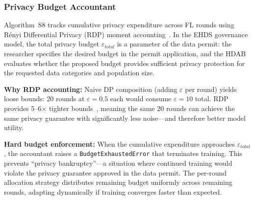 \documentclass[conference]{IEEEtran}
\begin{document}
\subsubsection{Privacy Budget Accountant}

Algorithm~S8 tracks cumulative privacy expenditure across FL rounds using R\'enyi Differential Privacy (RDP) moment accounting~\cite{mironov2017renyi}. In the EHDS governance model, the total privacy budget $\varepsilon_{total}$ is a parameter of the data permit: the researcher specifies the desired budget in the permit application, and the HDAB evaluates whether the proposed budget provides sufficient privacy protection for the requested data categories and population size.

\textbf{Why RDP accounting:} Naive DP composition (adding $\varepsilon$ per round) yields loose bounds: 20 rounds at $\varepsilon{=}0.5$ each would consume $\varepsilon{=}10$ total. RDP provides 5--6$\times$ tighter bounds~\cite{mironov2017renyi, wei2020federated}, meaning the same 20 rounds can achieve the same privacy guarantee with significantly less noise---and therefore better model utility.

\textbf{Hard budget enforcement:} When the cumulative expenditure approaches $\varepsilon_{total}$, the accountant raises a \texttt{BudgetExhaustedError} that terminates training. This prevents ``privacy bankruptcy''---a situation where continued training would violate the privacy guarantee approved in the data permit. The per-round allocation strategy distributes remaining budget uniformly across remaining rounds, adapting dynamically if training converges faster than expected.
\end{document}
